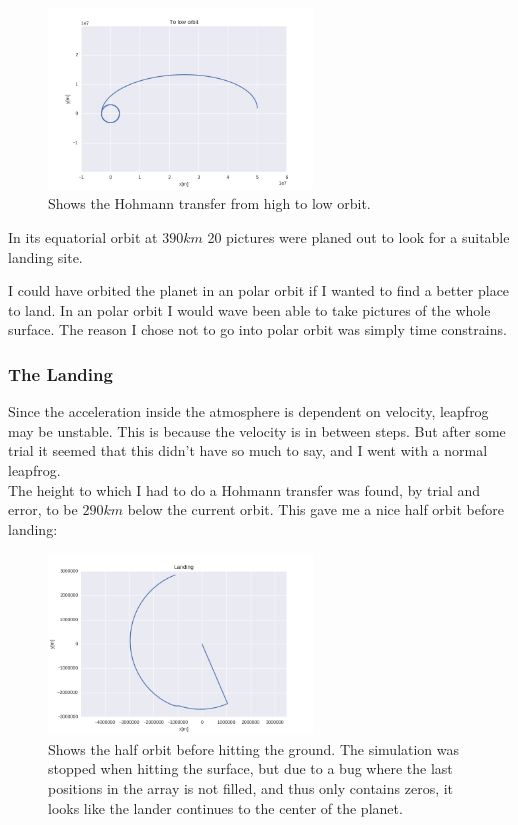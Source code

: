 \documentclass[a4paper, 10pt]{article}
\begin{document}
\begin{figure}[H]
\centering
\includegraphics[width = 70mm]{part6orb.png}
\caption{Shows the Hohmann transfer from high to low orbit.}
\end{figure}

In its equatorial orbit at $390 km$ 20 pictures were planed out to look for a suitable landing site.


I could have orbited the planet in an polar orbit if I wanted to find a better place to land. In an polar orbit I would wave been able to take pictures of the whole surface. The reason I chose not to go into polar orbit was simply time constrains.

\subsubsection{The Landing}
Since the acceleration inside the atmosphere is dependent on velocity, leapfrog may be unstable. This is because the velocity is in between steps. But after some trial it seemed that this didn't have so much to say, and I went with a normal leapfrog.\\
 
The height to which I had to do a Hohmann transfer was found, by trial and error, to be $290 km$ below the current orbit. This gave me a nice half orbit before landing:

\begin{figure}[H]
\centering
\includegraphics[width = 70mm]{part7landing.png}
\caption{Shows the half orbit before hitting the ground. The simulation was stopped when hitting the surface, but due to a bug where the last positions in the array is not filled, and thus only contains zeros, it looks like the lander continues to the center of the planet.}
\end{figure}
\end{document}

